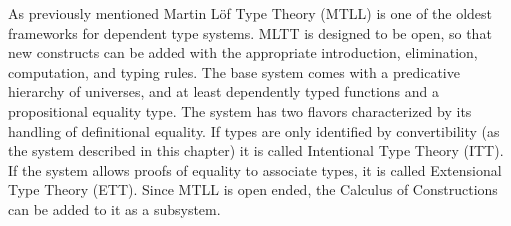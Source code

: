 As previously mentioned Martin L{\"o}f Type Theory (\ac{MTLL})\cite{Martin-Lof-1972} is one of the oldest frameworks for dependent type systems.
MLTT is designed to be open, so that new constructs can be added with the appropriate introduction, elimination, computation, and typing rules.
The base system comes with a predicative hierarchy of universes, and at least dependently typed functions and a propositional equality type.
The system has two flavors characterized by its handling of definitional equality.
If types are only identified by convertibility (as the system described in this chapter) it is called Intentional Type Theory (\ac{ITT}).
If the system allows proofs of equality to associate types, it is called Extensional Type Theory (\ac{ETT}).
Since \ac{MTLL} is open ended, the Calculus of Constructions can be added to it as a subsystem\cite{aspinall2004dependent,hofmann1997extensional}.







